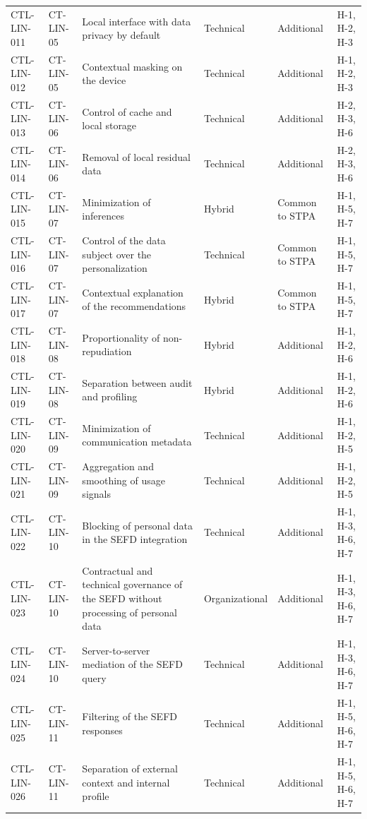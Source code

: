 \begin{footnotesize}
\begin{longtable}{l p{} p{} p{} p{} p{}}
        CTL-LIN-011 & CT-LIN-05 & Local interface with data privacy by default & Technical & Additional & H-1, H-2, H-3 \\
        CTL-LIN-012 & CT-LIN-05 & Contextual masking on the device & Technical & Additional & H-1, H-2, H-3 \\
        CTL-LIN-013 & CT-LIN-06 & Control of cache and local storage & Technical & Additional & H-2, H-3, H-6 \\
        CTL-LIN-014 & CT-LIN-06 & Removal of local residual data & Technical & Additional & H-2, H-3, H-6 \\
        CTL-LIN-015 & CT-LIN-07 & Minimization of inferences & Hybrid & Common to STPA & H-1, H-5, H-7 \\
        CTL-LIN-016 & CT-LIN-07 & Control of the data subject over the personalization & Technical & Common to STPA & H-1, H-5, H-7 \\
        CTL-LIN-017 & CT-LIN-07 & Contextual explanation of the recommendations & Hybrid & Common to STPA & H-1, H-5, H-7 \\
        CTL-LIN-018 & CT-LIN-08 & Proportionality of non-repudiation & Hybrid & Additional & H-1, H-2, H-6 \\
        CTL-LIN-019 & CT-LIN-08 & Separation between audit and profiling & Hybrid & Additional & H-1, H-2, H-6 \\
        CTL-LIN-020 & CT-LIN-09 & Minimization of communication metadata & Technical & Additional & H-1, H-2, H-5 \\
        CTL-LIN-021 & CT-LIN-09 & Aggregation and smoothing of usage signals & Technical & Additional & H-1, H-2, H-5 \\
        CTL-LIN-022 & CT-LIN-10 & Blocking of personal data in the SEFD integration & Technical & Additional & H-1, H-3, H-6, H-7 \\
        CTL-LIN-023 & CT-LIN-10 & Contractual and technical governance of the SEFD without processing of personal data & Organizational & Additional & H-1, H-3, H-6, H-7 \\
        CTL-LIN-024 & CT-LIN-10 & Server-to-server mediation of the SEFD query & Technical & Additional & H-1, H-3, H-6, H-7 \\
        CTL-LIN-025 & CT-LIN-11 & Filtering of the SEFD responses & Technical & Additional & H-1, H-5, H-6, H-7 \\
        CTL-LIN-026 & CT-LIN-11 & Separation of external context and internal profile & Technical & Additional & H-1, H-5, H-6, H-7 \\

\end{longtable}
\end{footnotesize}
